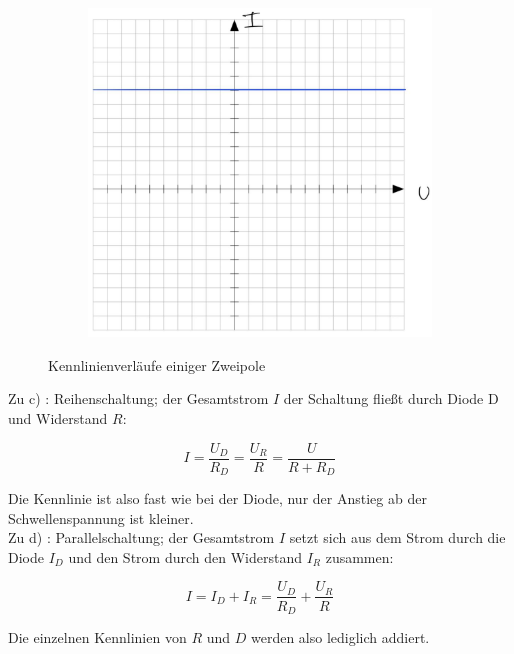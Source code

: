 \begin{figure}[H]
\begin{subfigure}[b]{0.45\textwidth}
        \caption{}
        \label{fig:VA_C_e}
    \end{subfigure}
    \hfill
    \begin{subfigure}[b]{0.45\textwidth}
        \includegraphics[width=\textwidth]{figs/Voraufgaben/Cf.jpg}
        \caption{}
        \label{fig:VA_C_f}
    \end{subfigure}
    \caption{Kennlinienverläufe einiger Zweipole}
\end{figure}



Zu c) : Reihenschaltung; der Gesamtstrom $I$ der Schaltung fließt durch Diode D und Widerstand $R$:

\[
I = \frac{U_D}{R_D} = \frac{U_R}{R} = \frac{U}{R + R_D}
\]

Die Kennlinie ist also fast wie bei der Diode, nur der Anstieg ab der Schwellenspannung ist kleiner.
\\

Zu d) : Parallelschaltung; der Gesamtstrom $I$ setzt sich aus dem Strom durch die Diode $I_D$ und den Strom durch den Widerstand $I_R$ zusammen:

\[
I = I_D + I_R = \frac{U_D}{R_D} + \frac{U_R}{R}
\]

Die einzelnen Kennlinien von $R$ und $D$ werden also lediglich addiert.


